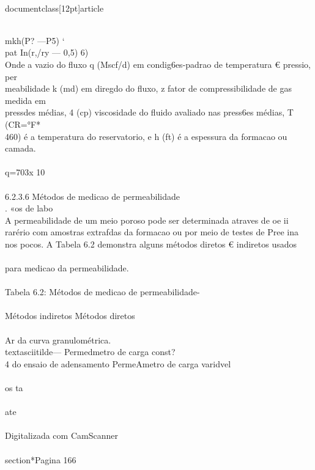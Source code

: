 \\documentclass[12pt]{article}
\begin{document}
\\
mkh(P? —P5) ‘\\
pat In(r,/ry — 0,5) 6)\\
Onde a vazio do fluxo q (Mscf/d) em condig6es-padrao de temperatura € pressio, per\\
meabilidade k (md) em diregdo do fluxo, z fator de compressibilidade de gas medida em\\
pressdes médias, 4 (cp) viscosidade do fluido avaliado nas press6es médias, T (CR=°F*\\
460) é a temperatura do reservatorio, e h (ft) é a espessura da formacao ou camada.\\
\\
q=703x 10\\%
\\
6.2.3.6 Métodos de medicao de permeabilidade\\
. «os de labo\\
A permeabilidade de um meio poroso pode ser determinada atraves de oe ii\\
rarério com amostras extrafdas da formacao ou por meio de testes de Pree ina\\
nos pocos. A Tabela 6.2 demonstra alguns métodos diretos € indiretos usados\\
\\
para medicao da permeabilidade.\\
\\
Tabela 6.2: Métodos de medicao de permeabilidade-\\
\\
Métodos indiretos Métodos diretos\\
\\
Ar da curva granulométrica. \\textasciitilde{}— Permedmetro de carga const?\\
4 do ensaio de adensamento PermeAmetro de carga varidvel\\
\\
os ta\\
\\
ate\\
\\
Digitalizada com CamScanner\\

\\section*{Pagina 166}
\end{document}
